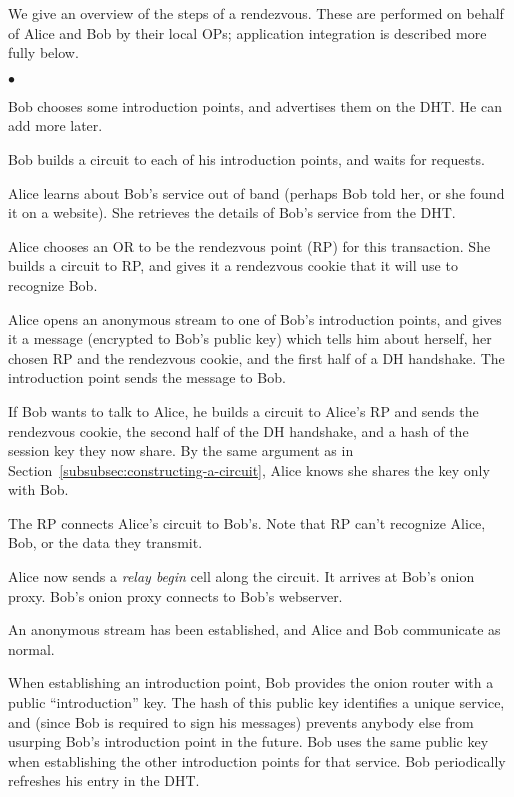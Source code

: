 \documentclass[times,10pt,twocolumn]{article}
\newenvironment{tightlist}{\begin{list}{$\bullet$}{
  \setlength{\itemsep}{0mm}
    \setlength{\parsep}{0mm}
    }}{\end{list}}
\begin{document}
We give an overview of the steps of a rendezvous. These are
performed on behalf of Alice and Bob by their local OPs;
application integration is described more fully below.

\begin{tightlist}
\item Bob chooses some introduction points, and advertises them on
      the DHT.  He can add more later.
\item Bob builds a circuit to each of his introduction points,
      and waits for requests.
\item Alice learns about Bob's service out of band (perhaps Bob told her,
      or she found it on a website). She retrieves the details of Bob's
      service from the DHT.
\item Alice chooses an OR to be the rendezvous point (RP) for this
      transaction. She builds a circuit to RP, and gives it a
      rendezvous cookie that it will use to recognize Bob.
\item Alice opens an anonymous stream to one of Bob's introduction
      points, and gives it a message (encrypted to Bob's public key)
      which tells him
      about herself, her chosen RP and the rendezvous cookie, and the
      first half of a DH
      handshake. The introduction point sends the message to Bob.
\item If Bob wants to talk to Alice, he builds a circuit to Alice's
      RP and sends the rendezvous cookie, the second half of the DH
      handshake, and a hash of the session
      key they now share. By the same argument as in
      Section~\ref{subsubsec:constructing-a-circuit}, Alice knows she
      shares the key only with Bob.
\item The RP connects Alice's circuit to Bob's. Note that RP can't
      recognize Alice, Bob, or the data they transmit.
\item Alice now sends a \emph{relay begin} cell along the circuit. It
      arrives at Bob's onion proxy. Bob's onion proxy connects to Bob's
      webserver.
\item An anonymous stream has been established, and Alice and Bob
      communicate as normal.
\end{tightlist}

When establishing an introduction point, Bob provides the onion router
with a public ``introduction'' key. The hash of this public key
identifies a unique service, and (since Bob is required to sign his
messages) prevents anybody else from usurping Bob's introduction point
in the future. Bob uses the same public key when establishing the other
introduction points for that service. Bob periodically refreshes his
entry in the DHT.
\end{document}

